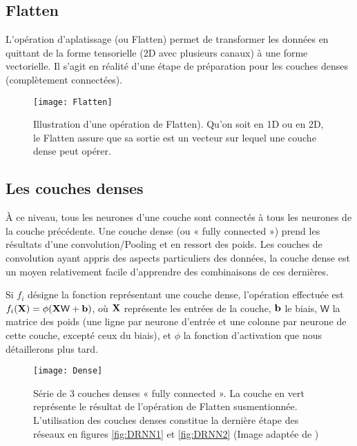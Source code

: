 \subsection{Flatten}
L'opération d'aplatissage (ou Flatten) permet de transformer les données en quittant de la forme tensorielle (2D avec plusieurs canaux) à une forme vectorielle. Il s'agit en réalité d'une étape de préparation pour les couches denses (complètement connectées).

\begin{figure}[!h] 
\centering
\texttt{[image: Flatten]}
\decoRule
\caption[Flatten]{Illustration d'une opération de Flatten). Qu'on soit en 1D ou en 2D, le Flatten assure que sa sortie est un vecteur sur lequel une couche dense peut opérer.}
\label{fig:Flatten}
\end{figure} 

\subsection{Les couches denses}
À ce niveau, tous les neurones d'une couche sont connectés à tous les neurones de la couche précédente. Une couche dense (ou « fully connected ») prend les résultats d'une convolution/Pooling et en ressort des poids. Les couches de convolution ayant appris des aspects particuliers des données, la couche dense est un moyen relativement facile d'apprendre des combinaisons de ces dernières.

Si $f_i$ désigne la fonction représentant une couche dense, l'opération effectuée est $f_i(\mathbf{X})=\phi(\mathbf{X} \mathsf{W} + \mathbf{b})$, où $\mathbf{X}$ représente les entrées de la couche, $\mathbf{b}$ le biais, $\mathsf{W}$ la matrice des poids (une ligne par neurone d'entrée et une colonne par neurone de cette couche, excepté ceux du biais), et $\phi$ la fonction d'activation que nous détaillerons plus tard. \parencite[286]{Reference8}

\begin{figure}[!h] 
\centering
\texttt{[image: Dense]} 
\decoRule
\caption[Dense]{Série de 3 couches denses « fully connected ». La couche en vert représente le résultat de l'opération de Flatten susmentionnée. L'utilisation des couches denses constitue la dernière étape des réseaux en figures \ref{fig:DRNN1} et \ref{fig:DRNN2} (Image adaptée de \parencite{Reference9})}
\label{fig:Dense}
\end{figure}


